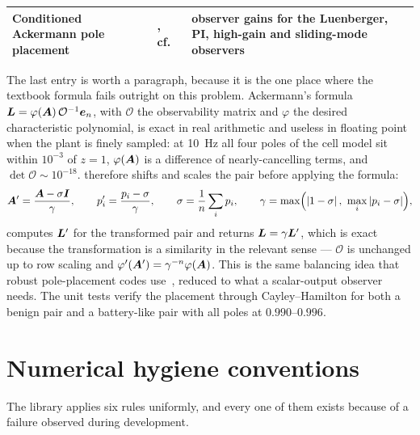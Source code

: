 \begin{table}[H]
\begin{tabular}{@{}>{\raggedright\arraybackslash}p{}>{\raggedright\arraybackslash}p{}>{\raggedright\arraybackslash}p{}@{}}
Conditioned Ackermann pole placement & \cite{ackermann1972,ogata2010}, cf.~\cite{kautsky1985} & observer gains for the Luenberger, PI, high-gain and sliding-mode observers \\
\bottomrule\end{tabular}
\end{table}

The last entry is worth a paragraph, because it is the one place where the textbook formula fails
outright on this problem. Ackermann's formula
$\bm{L} = \varphi(\bm{A})\,\mathcal{O}^{-1}\bm e_{n}$, with $\mathcal{O}$ the observability matrix and
$\varphi$ the desired characteristic polynomial, is exact in real arithmetic and useless in
floating point when the plant is finely sampled: at \SI{10}{\hertz} all four poles of the cell
model sit within $10^{-3}$ of $z=1$, $\varphi(\bm{A})$ is a difference of nearly-cancelling terms, and
$\det\mathcal{O} \sim 10^{-18}$.  therefore shifts and scales the
pair before applying the formula:
\begin{equation}
\bm{A}' = \frac{\bm{A} - \sigma\bm{I}}{\gamma},\qquad p_i' = \frac{p_i-\sigma}{\gamma},
\qquad \sigma = \frac{1}{n}\sum_i p_i,
\qquad \gamma = \max\Bigl(\left\lvert 1-\sigma \right\rvert,\ \max_i\left\lvert p_i-\sigma \right\rvert\Bigr),
\label{eq:lib-ackermann}
\end{equation}
computes $\bm{L}'$ for the transformed pair and returns $\bm{L} = \gamma\bm{L}'$, which is exact because the
transformation is a similarity in the relevant sense --- $\mathcal{O}$ is unchanged up to row
scaling and $\varphi'(\bm{A}') = \gamma^{-n}\varphi(\bm{A})$. This is the same balancing idea that robust
pole-placement codes use~\cite{kautsky1985}, reduced to what a scalar-output observer needs. The
unit tests verify the placement through Cayley--Hamilton for both a benign pair and a battery-like
pair with all poles at $0.990$--$0.996$.

\section{Numerical hygiene conventions}
\label{sec:lib-hygiene}

The library applies six rules uniformly, and every one of them exists because of a failure observed
during development.

